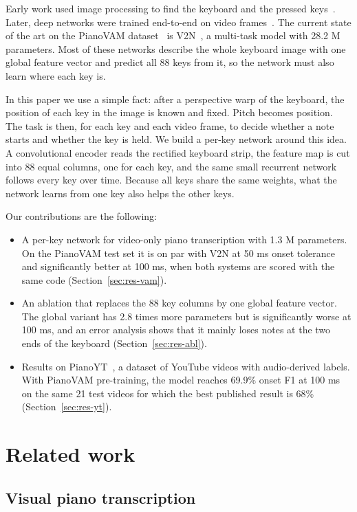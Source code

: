 \documentclass[pdflatex,sn-mathphys-num]{sn-jnl}
\begin{document}
Early work used image processing to find the keyboard and the pressed keys~\cite{akbari2015}. Later, deep networks were trained end-to-end on video frames~\cite{koepke2020,su2020,zivanovic2025}. The current state of the art on the PianoVAM dataset~\cite{kim2025pianovam} is V2N~\cite{kim2026v2n}, a multi-task model with 28.2 M parameters. Most of these networks describe the whole keyboard image with one global feature vector and predict all 88 keys from it, so the network must also learn where each key is.

In this paper we use a simple fact: after a perspective warp of the keyboard, the position of each key in the image is known and fixed. Pitch becomes position. The task is then, for each key and each video frame, to decide whether a note starts and whether the key is held. We build a per-key network around this idea. A convolutional encoder reads the rectified keyboard strip, the feature map is cut into 88 equal columns, one for each key, and the same small recurrent network follows every key over time. Because all keys share the same weights, what the network learns from one key also helps the other keys.

Our contributions are the following:
\begin{itemize}
\item A per-key network for video-only piano transcription with 1.3 M parameters. On the PianoVAM test set it is on par with V2N at 50 ms onset tolerance and significantly better at 100 ms, when both systems are scored with the same code (Section~\ref{sec:res-vam}).
\item An ablation that replaces the 88 key columns by one global feature vector. The global variant has 2.8 times more parameters but is significantly worse at 100 ms, and an error analysis shows that it mainly loses notes at the two ends of the keyboard (Section~\ref{sec:res-abl}).
\item Results on PianoYT~\cite{su2020}, a dataset of YouTube videos with audio-derived labels. With PianoVAM pre-training, the model reaches 69.9\% onset F1 at 100 ms on the same 21 test videos for which the best published result is 68\%~\cite{zivanovic2025} (Section~\ref{sec:res-yt}).
\end{itemize}

\section{Related work}\label{sec:related}

\subsection{Visual piano transcription}
\end{document}
